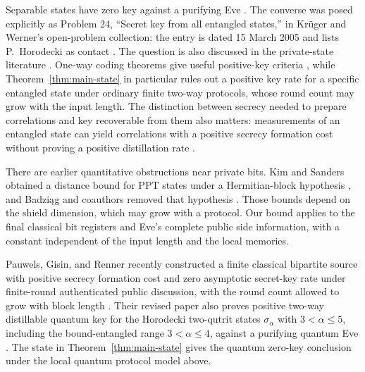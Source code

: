 Separable states have zero key against a purifying Eve
\cite{CurtyLewensteinLutkenhaus04,keyBoundEntanglement}.  The converse was
posed explicitly as Problem 24, ``Secret key from all entangled states,'' in
Kr\"uger and Werner's open-problem collection: the entry is dated
15 March 2005 and lists P.~Horodecki as contact \cite{KrugerWerner05}.
The question is also discussed in the private-state literature
\cite{keyPrivateStates,HorodeckiEtAl18}.  One-way coding theorems give useful
positive-key criteria \cite{DevetakWinter05}, while Theorem~\ref{thm:main-state}
in particular rules out a positive key rate for a specific entangled state
under ordinary finite two-way protocols, whose round count may grow with
the input length.  The distinction
between secrecy needed to prepare correlations and key recoverable from
them also matters: measurements of an entangled state can yield correlations
with a positive secrecy formation cost without proving a positive
distillation rate \cite{GisinWolf00,GisinRennerWolf02,AcinGisin05}.

There are earlier quantitative obstructions near private bits.  Kim and
Sanders obtained a distance bound for PPT states under a Hermitian-block
hypothesis \cite{KimSanders10}, and Badzi\k{a}g and coauthors removed that
hypothesis \cite{BadziagEtAl14}.  Those bounds depend on the shield dimension,
which may grow with a protocol.  Our bound applies to the final classical bit
registers and Eve's complete public side information, with a constant
independent of the input length and the local memories.

Pauwels, Gisin, and Renner recently constructed a finite classical bipartite
source with positive secrecy formation cost and zero asymptotic secret-key
rate under finite-round authenticated public discussion, with the round
count allowed to grow with block length
\cite[Theorem 1 and Appendix A]{PauwelsGisinRenner2026}.
Their revised paper also proves positive two-way distillable quantum key for
the Horodecki two-qutrit states $\sigma_\alpha$ with $3<\alpha\leq5$,
including the bound-entangled range $3<\alpha\leq4$, against a purifying quantum Eve
\cite[Corollary 3 and Appendix I.7]{PauwelsGisinRenner2026}.  The state in
Theorem~\ref{thm:main-state} gives the quantum zero-key conclusion under the
local quantum protocol model above.

